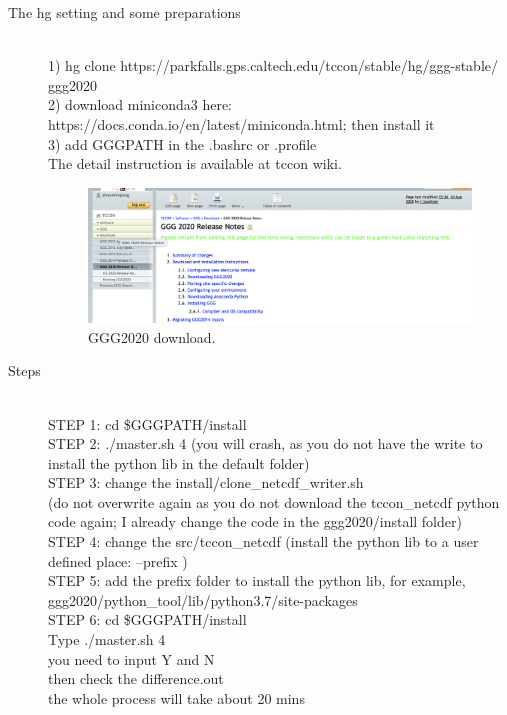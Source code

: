\documentclass{article}
\begin{document}
\begin{description}
\item[The hg setting and some preparations] \hfill \\
1) hg clone https://parkfalls.gps.caltech.edu/tccon/stable/hg/ggg-stable/ ggg2020  \\
2) download miniconda3 here: https://docs.conda.io/en/latest/miniconda.html; then install it\\
3) add GGGPATH in the .bashrc or .profile\\

The detail instruction is available at tccon wiki.  
\begin{figure}[h]
\begin{center}
\includegraphics[width=1.0\textwidth]{./figures/tcconwiki.png} 
\caption{GGG2020 download.}
\end{center}
\end{figure}


\item[Steps] \hfill \\
STEP 1: cd \$GGGPATH/install  \\
STEP 2: ./master.sh 4  (you will crash, as you do not have the write to install the python lib in the default folder) \\
STEP 3: change the  install/clone\_netcdf\_writer.sh \\
(do not overwrite again as you do not download the tccon\_netcdf python code again; I already change the code in the ggg2020/install folder) \\
STEP 4: change the src/tccon\_netcdf 
(install the python lib to a user defined place: --prefix  )\\
STEP 5: add the prefix folder to install the python lib, for example, ggg2020/python\_tool/lib/python3.7/site-packages \\
STEP 6: cd \$GGGPATH/install  \\
Type ./master.sh 4\\
you need to input Y and N \\
then check the difference.out \\
the whole process will take about 20 mins\\



\end{description}
\end{document}
